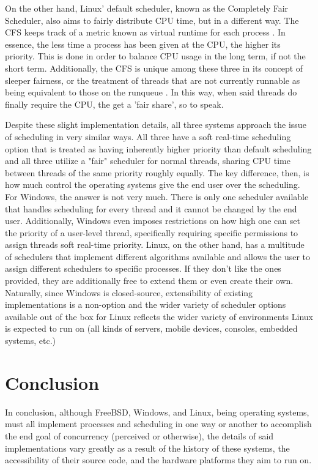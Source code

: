 \documentclass[onecolumn, draftclsnofoot,10pt, compsoc]{IEEEtran}
\begin{document}
On the other hand, Linux' default scheduler, known as the Completely Fair Scheduler, also aims to fairly distribute CPU time, but in a different way. The CFS keeps track of a metric known as virtual runtime for each process \cite{CFS}. In essence, the less time a process has been given at the CPU, the higher its priority. This is done in order to balance CPU usage in the long term, if not the short term. Additionally, the CFS is unique among these three in its concept of sleeper fairness, or the treatment of threads that are not currently runnable as being equivalent to those on the runqueue \cite{CFS}. In this way, when said threads do finally require the CPU, the get a 'fair share', so to speak. 

Despite these slight implementation details, all three systems approach the issue of scheduling in very similar ways. All three have a soft real-time scheduling option that is treated as having inherently higher priority than default scheduling and all three utilize a "fair" scheduler for normal threads, sharing CPU time between threads of the same priority roughly equally. The key difference, then, is how much control the operating systems give the end user over the scheduling. For Windows, the answer is not very much. There is only one scheduler available that handles scheduling for every thread and it cannot be changed by the end user. Additionally, Windows even imposes restrictions on how high one can set the priority of a user-level thread, specifically requiring specific permissions to assign threads soft real-time priority. Linux, on the other hand, has a multitude of schedulers that implement different algorithms available and allows the user to assign different schedulers to specific processes. If they don't like the ones provided, they are additionally free to extend them or even create their own. Naturally, since Windows is closed-source, extensibility of existing implementations is a non-option and the wider variety of scheduler options available out of the box for Linux reflects the wider variety of environments Linux is expected to run on (all kinds of servers, mobile devices, consoles, embedded systems, etc.)

\section{Conclusion}
In conclusion, although FreeBSD, Windows, and Linux, being operating systems, must all implement processes and scheduling in one way or another to accomplish the end goal of concurrency (perceived or otherwise), the details of said implementations vary greatly as a result of the history of these systems, the accessibility of their source code, and the hardware platforms they aim to run on.


\end{document}

